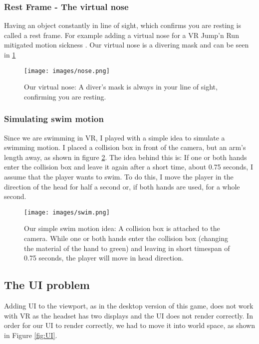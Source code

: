\documentclass[letterpaper, 10 pt, conference]{ieeeconf}  %
\begin{document}
\subsubsection {Rest Frame - The virtual nose}

Having an object constantly in line of sight, which confirms you are resting is called a rest frame.
For example adding a virtual nose for a VR Jump'n Run mitigated motion sickness \cite{wienrich2018virtual}.
Our virtual nose is a divering mask and can be seen in \ref{fig:nose}

 \begin{figure}[!ht]
    \caption{Our virtual nose: A diver's mask is always in your line of sight, confirming you are resting.}
    \centering
    \texttt{[image: images/nose.png]}
    \label{fig:nose}
\end{figure}

\subsubsection{Simulating swim motion}

Since we are swimming in VR, I played with a simple idea to simulate a swimming motion.
I placed a collision box in front of the camera, but an arm's length away, as shown in figure \ref{fig:swim}.
The idea behind this is: 
If one or both hands enter the collision box and leave it again after a short time, about 0.75 seconds, I assume that the player wants to swim.
To do this, I move the player in the direction of the head for half a second or, if both hands are used, for a whole second.

\begin{figure}[!ht]
    \caption{Our simple swim motion idea: A collision box is attached to the camera.
    While one or both hands enter the collision box (changing the material of the hand to green) and leaving in short timespan of 0.75 seconds, the player will move in head direction.}
    \centering
    \texttt{[image: images/swim.png]}
    \label{fig:swim}
\end{figure}

\subsection{The UI problem}

Adding UI to the viewport, as in the desktop version of this game, does not work with VR as the headset has two displays and the UI does not render correctly.
In order for our UI to render correctly, we had to move it into world space, as shown in Figure \ref{fig:UI}.
\end{document}

